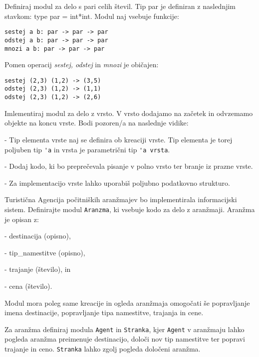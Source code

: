



\begin{ex}
Definiraj modul za delo s pari celih \v stevil. Tip par je definiran z
naslednjim stavkom: type par = int*int. Modul naj vsebuje funkcije:

\begin{lstlisting}
sestej a b: par -> par -> par
odstej a b: par -> par -> par
mnozi a b: par -> par -> par
\end{lstlisting}
Pomen operacij \emph{sestej, odstej} in \emph{mnozi} je obi\v cajen:
\begin{lstlisting}
sestej (2,3) (1,2) -> (3,5)
odstej (2,3) (1,2) -> (1,1)
odstej (2,3) (1,2) -> (2,6)
\end{lstlisting}
\end{ex}



\begin{ex}
Imlementiraj modul za delo z vrsto. V vrsto dodajamo na za\v cetek in
odvzemamo objekte na koncu vrste. Bodi pozoren/a na naslednje vidike:

- Tip elementa vrste naj se definira ob kreaciji vrste. Tip elementa
  je torej poljuben tip \lstinline{'a} in vrsta je parametri\v cni tip \lstinline{'a vrsta}.
  
- Dodaj kodo, ki bo prepre\v cevala pisanje v polno vrsto ter branje iz
  prazne vrste.
  
- Za implementacijo vrste lahko uporabi\v s poljubno podatkovno strukturo.
\end{ex}



\begin{ex}
Turisti\v cna Agencija po\v citni\v skih aran\v zmajev bo implementirala
informacijski sistem.
Definirajte modul \lstinline{Aranzma}, ki vsebuje kodo za delo z
aran\v zmaji. Aran\v zma je opisan z:

- destinacija (opisno), 

- tip\_namestitve (opisno), 

- trajanje (\v stevilo), in 

- cena (\v stevilo).

Modul mora poleg same kreacije in ogleda aran\v zmaja omogo\v cati \v se
popravljanje imena destinacije, popravljanje tipa namestitve, trajanja
in cene.

Za aran\v zma definiraj modula \lstinline{Agent} in \lstinline{Stranka}, kjer \lstinline{Agent} v aran\v zmaju
lahko pogleda aran\v zma preimenuje destinacijo, dolo\v ci nov tip
namestitve ter popravi trajanje in ceno. \lstinline{Stranka} lahko zgolj pogleda
dolo\v ceni aran\v zma.
\end{ex}




